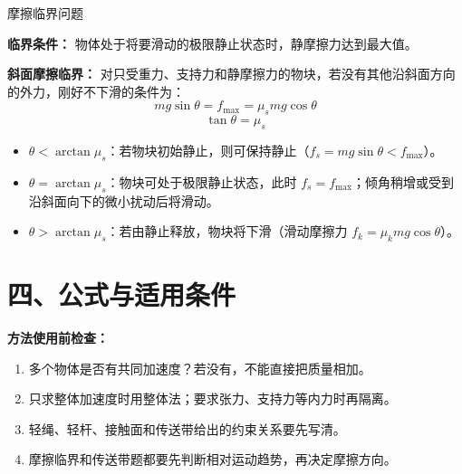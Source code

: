 \begin{conceptbox}{摩擦临界问题}

\textbf{临界条件：} 物体处于将要滑动的极限静止状态时，静摩擦力达到最大值。

\textbf{斜面摩擦临界：} 对只受重力、支持力和静摩擦力的物块，若没有其他沿斜面方向的外力，刚好不下滑的条件为：
\[
mg\sin\theta = f_{\max} = \mu_s mg\cos\theta
\]
\[
\boxed{\tan\theta = \mu_s}
\]

\begin{itemize}
  \item $\theta < \arctan\mu_s$：若物块初始静止，则可保持静止（$f_s = mg\sin\theta < f_{\max}$）。
  \item $\theta = \arctan\mu_s$：物块可处于极限静止状态，此时 $f_s=f_{\max}$；倾角稍增或受到沿斜面向下的微小扰动后将滑动。
  \item $\theta > \arctan\mu_s$：若由静止释放，物块将下滑（滑动摩擦力 $f_k = \mu_k mg\cos\theta$）。
\end{itemize}

\begin{center}


\label{fig:critical-incline}
\end{center}

\end{conceptbox}

\section*{四、公式与适用条件}

\textbf{方法使用前检查：}
\begin{enumerate}
  \item 多个物体是否有共同加速度？若没有，不能直接把质量相加。
  \item 只求整体加速度时用整体法；要求张力、支持力等内力时再隔离。
  \item 轻绳、轻杆、接触面和传送带给出的约束关系要先写清。
  \item 摩擦临界和传送带题都要先判断相对运动趋势，再决定摩擦方向。
\end{enumerate}

